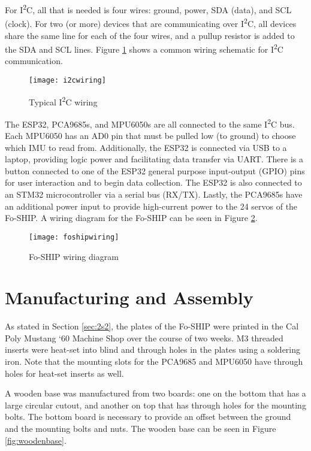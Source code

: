 \documentclass[12pt,a4paper]{report}
\begin{document}
For I\textsuperscript{2}C, all that is needed is four wires: ground, power, SDA (data), and SCL (clock). For two (or more) devices that are communicating over I\textsuperscript{2}C, all devices share the same line for each of the four wires, and a pullup resistor is added to the SDA and SCL lines. Figure \ref{fig:i2cwiring} shows a common wiring schematic for I\textsuperscript{2}C communication.

\begin{figure}[htbp]
	\centering
	\texttt{[image: i2cwiring]}
	\caption{Typical I\textsuperscript{2}C wiring \cite{tiI2C}}
	\label{fig:i2cwiring}
\end{figure}

The ESP32, PCA9685s, and MPU6050s are all connected to the same I\textsuperscript{2}C bus. Each MPU6050 has an AD0 pin that must be pulled low (to ground) to choose which IMU to read from. Additionally, the ESP32 is connected via USB to a laptop, providing logic power and facilitating data transfer via UART. There is a button connected to one of the ESP32 general purpose input-output (GPIO) pins for user interaction and to begin data collection. The ESP32 is also connected to an STM32 microcontroller via a serial bus (RX/TX). Lastly, the PCA9685s have an additional power input to provide high-current power to the 24 servos of the Fo-SHIP. A wiring diagram for the Fo-SHIP can be seen in Figure \ref{fig:foshipwiring}.

\begin{figure}[htbp]
	\centering
	\texttt{[image: foshipwiring]}
	\caption{Fo-SHIP wiring diagram}
	\label{fig:foshipwiring}
\end{figure}

\section{Manufacturing and Assembly} \label{sec:2s4}
As stated in Section \ref{sec:2s2}, the plates of the Fo-SHIP were printed in the Cal Poly Mustang ‘60 Machine Shop over the course of two weeks. M3 threaded inserts were heat-set into blind and through holes in the plates using a soldering iron. Note that the mounting slots for the PCA9685 and MPU6050 have through holes for heat-set inserts as well.

A wooden base was manufactured from two boards: one on the bottom that has a large circular cutout, and another on top that has through holes for the mounting bolts. The bottom board is necessary to provide an offset between the ground and the mounting bolts and nuts. The wooden base can be seen in Figure \ref{fig:woodenbase}.
\end{document}

